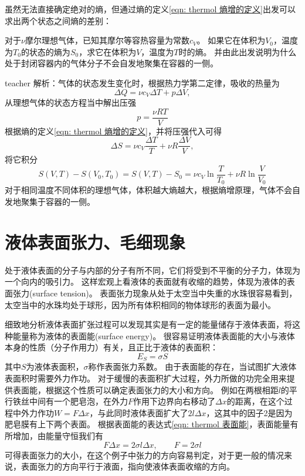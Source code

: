 虽然无法直接确定绝对的熵，但通过熵的定义\ref{eqn: thermol 熵增的定义}出发可以求出两个状态之间熵的差别：
\begin{example}
对于$\nu$摩尔理想气体，已知其摩尔等容热容量为常数$c_V$。
如果它在体积为$V_0$，温度为$T_0$的状态的熵为$S_0$，求它在体积为$V$，温度为$T$时的熵。
并由此出发说明为什么处于封闭容器内的气体分子不会自发地聚集在容器的一侧。
\begin{taggedblock}{teacher}
\newline
解析：气体的状态发生变化时，根据热力学第二定律，吸收的热量为
\[ 
\Delta Q = \nu c_V\Delta T+p\Delta V,
\]
从理想气体的状态方程当中解出压强
\[
p = \frac{\nu RT}{V}
\]
根据熵的定义\ref{eqn: thermol 熵增的定义}，并将压强代入可得
\[
\Delta S = \nu c_V\frac{\Delta T}{T}+\nu R\frac{\Delta V}{V},
\]
将它积分
\[
S(V,T)-S(V_0,T_0)=S(V,T)-S_0 = \nu c_V\ln\frac{T}{T_0}+\nu R\ln\frac{V}{V_0}
\]
对于相同温度不同体积的理想气体，体积越大熵越大，根据熵增原理，气体不会自发地聚集于容器的一侧。
\end{taggedblock}
\end{example}









\section{液体表面张力、毛细现象}
处于液体表面的分子与内部的分子有所不同，它们将受到不平衡的分子力，体现为一个向内的吸引力。
这样宏观上看液体的表面就有收缩的趋势，体现为液体的{\heiti 表面张力}(surface tension)。
表面张力现象从处于太空当中失重的水珠很容易看到，太空当中的水珠均处于球形，因为所有体积相同的物体球形的表面为最小。

细致地分析液体表面扩张过程可以发现其实是有一定的能量储存于液体表面，将这种能量称为液体的{\heiti 表面能}(surface energy)。
很容易证明液体表面能的大小与液体本身的性质（分子作用力）有关，且正比于液体的表面积：
\begin{equation}\label{eqn: thermol 表面能}
E_S = \sigma S
\end{equation}
其中$S$为液体表面积，$\sigma$称作表面张力系数。
由于表面能的存在，当试图扩大液体表面积时需要外力作功。
对于缓慢的表面积扩大过程，外力所做的功完全用来提供表面能，根据这个性质可以确定表面张力的大小和方向。
例如在两根相距$l$的平行铁丝中间有一个肥皂泡，在外力$F$作用下边界向右移动了$\Delta x$的距离，在这个过程中外力作功$W=F\Delta x$，与此同时液体表面扩大了$2l\Delta x$，这其中的因子2是因为肥皂膜有上下两个表面。
根据表面能的表达式\ref{eqn: thermol 表面能}，表面能量有所增加，由能量守恒我们有
\begin{equation}
F\Delta x = 2\sigma l\Delta x,\qquad F = 2\sigma l
\end{equation}
可得表面张力的大小，在这个例子中张力的方向容易判定，对于更一般的情况来说，表面张力的方向平行于液面，指向使液体表面收缩的方向。


